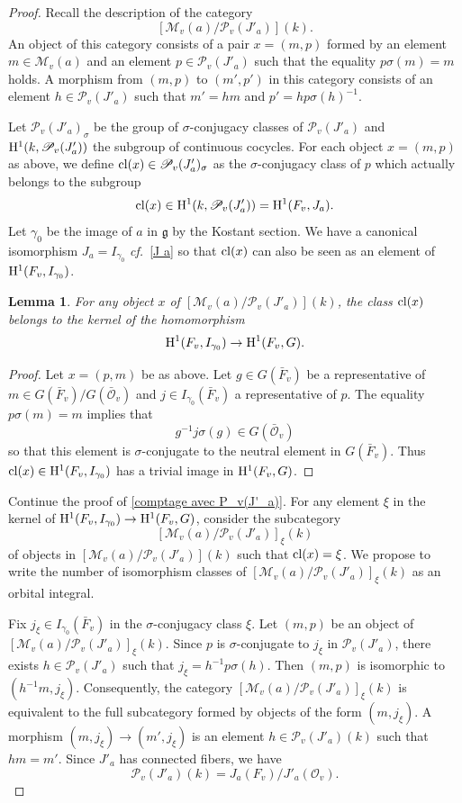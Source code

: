 \documentclass[12pt,english]{smfart}
\numberwithin{equation}{subsection}
\newtheorem{lemme}[equation]{Lemma}
\theoremstyle{remark}
\newcommand\calP{{\mathscr P}}
\newcommand\calM{{\mathscr M}}
\newcommand\calO{{\mathscr O}}
\newcommand\frakg{{\mathfrak g}}
\newcommand\rmH{{\rm H}}
\newcommand\cl{{\rm cl}}
\newcommand\cf{{\it cf.\ }}
\begin{document}
\begin{proof}
Recall the description of the category
$$[\calM_v(a)/\calP_v(J'_a)](k).$$
An object of this category consists of a pair $x=(m,p)$ formed by an
element $m\in \calM_v(a)$ and an element $p\in \calP_v(J'_a)$ such
that the equality $p\sigma(m)=m$ holds. A morphism from $(m,p)$ to
$(m',p')$ in this category consists of an element $h\in
\calP_v(J'_a)$ such that $m'=hm$ and $p'=hp \sigma(h)^{-1}$.

Let $\calP_v(J'_a)_\sigma$ be the group of $\sigma$-conjugacy classes of
$\calP_v(J'_a)$ and $\rmH^1(k,\calP_v(J'_a))$ the subgroup of continuous
cocycles. For each object $x=(m,p)$ as above, we define $\cl(x)\in
\calP_v(J'_a)_\sigma$ as the $\sigma$-conjugacy class of $p$ which actually
belongs to the subgroup
$$\cl(x)\in \rmH^1(k,\calP_v(J'_a))=\rmH^1(F_v,J_a).$$
Let $\gamma_0$ be the image of $a$ in $\frakg$ by the Kostant section. We
have a canonical isomorphism $J_a=I_{\gamma_0}$ \cf \ref{J a} so that
$\cl(x)$ can also be seen as an element of
$\rmH^1(F_v,I_{\gamma_0})$.

\begin{lemme}
For any object $x$ of $[\calM_v(a)/\calP_v(J'_a)](k)$, the class $\cl(x)$
belongs to the kernel of the homomorphism
$$\rmH^1(F_v,I_{\gamma_0})\rightarrow \rmH^1(F_v,G).$$
\end{lemme}

\begin{proof}
Let $x=(p,m)$ be as above. Let $g\in G(\bar F_v)$ be a representative
of $m\in G(\bar F_v)/ G(\bar\calO_v)$ and $j\in I_{\gamma_0}(\bar F_v)$ a
representative of $p$. The equality $p\sigma(m)=m$ implies that
$$g^{-1} j \sigma(g) \in G(\bar\calO_v)$$
so that this element is $\sigma$-conjugate to the neutral element
in $G(\bar F_v)$. Thus $\cl(x)\in \rmH^1(F_v,I_{\gamma_0})$ has a
trivial image in $\rmH^1(F_v,G)$.
\end{proof}

Continue the proof of \ref{comptage avec P_v(J'_a)}. For any
element $\xi$ in the kernel of $\rmH^1(F_v,I_{\gamma_0})\rightarrow
\rmH^1(F_v,G)$, consider the subcategory
$$[\calM_v(a)/\calP_v(J'_a)]_\xi(k)$$
of objects in $[\calM_v(a)/\calP_v(J'_a)](k)$ such that $\cl(x)=\xi$. We
propose to write the number of isomorphism classes of
$[\calM_v(a)/\calP_v(J'_a)]_\xi(k)$ as an orbital integral.

Fix $j_\xi \in I_{\gamma_0}(\bar F_v)$ in the $\sigma$-conjugacy class $\xi$. Let
$(m,p)$ be an object of $[\calM_v(a)/\calP_v(J'_a)]_\xi(k)$. Since $p$ is
$\sigma$-conjugate to $j_\xi$ in $\calP_v(J'_a)$, there exists $h\in
\calP_v(J'_a)$ such that $j_\xi=h^{-1}p \sigma(h)$. Then $(m,p)$ is
isomorphic to $(h^{-1}m,j_\xi)$. Consequently, the category
$[\calM_v(a)/\calP_v(J'_a)]_\xi(k)$ is equivalent to the full subcategory
formed by objects of the form $(m,j_\xi)$. A morphism $(m,j_\xi)
\rightarrow (m',j_\xi)$ is an element $h\in \calP_v(J'_a)(k)$ such that
$hm=m'$. Since $J'_a$ has connected fibers, we have
$$\calP_v(J'_a)(k)=J_a(F_v)/J'_a(\calO_v).$$


\end{proof}
\end{document}

